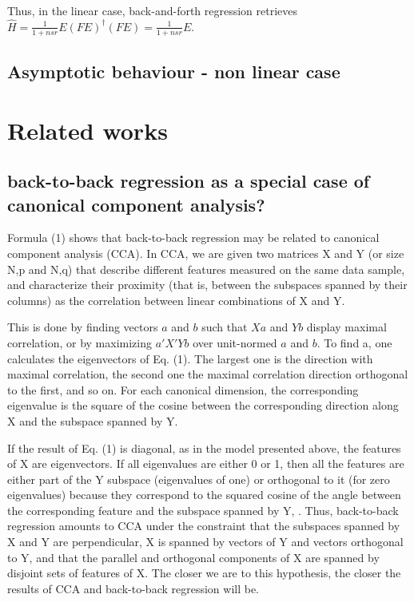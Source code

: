 \documentclass{article}
\begin{document}
Thus, in the linear case, back-and-forth regression retrieves $\hat H = \frac{1}{1+nsr} E (FE)^{\dagger}(FE) = \frac{1}{1+nsr} E$.

\subsection{Asymptotic behaviour - non linear case}

\section{Related works}
\subsection{back-to-back regression as a special case of canonical component analysis?}
Formula (1) shows that back-to-back regression may be related to canonical component analysis (CCA).
%
In CCA, we are given two matrices X and Y (or size N,p and N,q) that describe different features measured on the same data sample, and characterize their proximity (that is, between the subspaces spanned by their columns) as the correlation between linear combinations of X and Y.

This is done by finding vectors $a$ and $b$ such that $Xa$ and $Yb$ display maximal correlation, or by maximizing $a'X'Yb$ over unit-normed $a$ and $b$.
%
To find a, one calculates the eigenvectors of Eq. (1).
%
The largest one is the direction with maximal correlation, the second one the maximal correlation direction orthogonal to the first, and so on.
%
For each canonical dimension, the corresponding eigenvalue is the square of the cosine between the corresponding direction along X and the subspace spanned by Y.

If the result of Eq. (1) is diagonal, as in the model presented above, the features of X are eigenvectors.
%
If all eigenvalues are either 0 or 1, then all the features are either part of the Y subspace (eigenvalues of one) or orthogonal to it (for zero eigenvalues) because they correspond to the squared cosine of the angle between the corresponding feature and the subspace spanned by Y, .
%
Thus, back-to-back regression amounts to CCA under the constraint that the subspaces spanned by X and Y are perpendicular, X is spanned by vectors of Y and vectors orthogonal to Y, and that the parallel and orthogonal components of X are spanned by disjoint sets of features of X.
%
The closer we are to this hypothesis, the closer the results of CCA and back-to-back regression will be.
\end{document}
